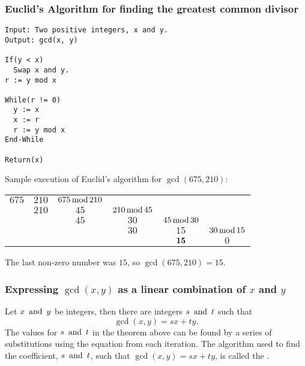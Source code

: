 \subsubsection*{Euclid's Algorithm for finding the greatest common divisor}
\begin{lstlisting}
Input: Two positive integers, x and y.
Output: gcd(x, y)

If(y < x)
  Swap x and y.
r := y mod x

While(r != 0)
  y := x
  x := r
  r := y mod x
End-While

Return(x)
\end{lstlisting}
Sample execution of Euclid's algorithm for $\gcd(675,210)$:
\begin{center}
  \begin{tabular}{cccccc}
    $675$ & $210$ & $675 \operatorname{\text{mod}} 210$                                                  \\
          & $210$ & $45$            & $210 \operatorname{\text{mod}} 45$                                 \\
          &       & $45$            & $30$           & $45 \operatorname{\text{mod}} 30$                 \\
          &       &                 & $30$           & $15$          & $30 \operatorname{\text{mod}} 15$ \\
          &       &                 &                & $\textbf{15}$    & $0$           \\
  \end{tabular}
\end{center}
The last non-zero number was $15$, so $\gcd(675,210) = 15$.

\subsubsection*{Expressing $\gcd(x,y)$ as a linear combination of $x$ and $y$}
Let $x \operatorname{~\text{and}~} y$ be integers, then there are integers $s \operatorname{~\text{and}~} t$ such that
\[
  \gcd(x,y) = sx + ty.
\]
The values for $s \operatorname{~\text{and}~} t$ in the theorem above can be found by a series of substitutions using the equation from each iteration. The algorithm used to find the coefficient, $s \operatorname{~\text{and}~} t$, such that $\gcd(x,y) = sx + ty$, is called the .

